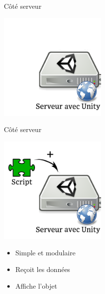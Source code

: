 \documentclass[a4paper,10pt]{beamer}
\begin{document}
	
	\begin{frame}{Côté serveur}
		\centerline{\includegraphics[height=150pt]{images/network/plugin1.png}}
		
	\end{frame}
	\begin{frame}{Côté serveur}
		\centerline{\includegraphics[height=150pt]{images/network/plugin.png}}
		\begin{itemize}	
			\item \pause Simple et modulaire \pause
			\item Reçoit les données \pause
			\item Affiche l'objet 
		\end{itemize}	
		
	\end{frame}
	
\end{document}
